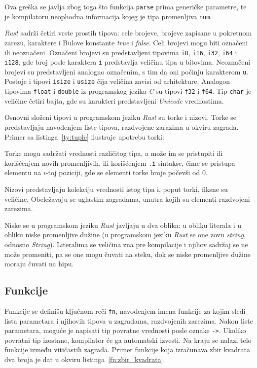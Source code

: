 \documentclass[12pt,oneside]{memoir}
\begin{document}
\noindent
Ova greška se javlja zbog toga što funkcija \texttt{parse}
prima generičke parametre, te je kompilatoru neophodna informacija
kojeg je tipa promenljiva \texttt{num}.

\emph{Rust} sadrži četiri vrste prostih tipova: cele brojeve,
brojeve zapisane u pokretnom zarezu, karaktere i Bulove
konstante \emph{true} i \emph{false}. Celi brojevi mogu biti
označeni ili neoznačeni. Označeni brojevi su predstavljeni
tipovima \texttt{i8}, \texttt{i16}, \texttt{i32}, \texttt{i64} i
\texttt{i128}, gde broj posle karaktera \texttt{i} predstavlja
veličinu tipa u bitovima. Neoznačeni brojevi su predstavljeni
analogno označenim, s tim da oni počinju karakterom \texttt{u}.
Postoje i tipovi \texttt{isize} i \texttt{usize} čija veličina
zavisi od arhitekture.
Analogon tipovima \texttt{float} i \texttt{double} iz programskog
jezika \emph{C} su tipovi \texttt{f32} i \texttt{f64}. Tip
\texttt{char} je veličine četiri bajta, gde su karakteri predstavljeni
\emph{Unicode} vrednostima.

Osnovni složeni tipovi u programskom jeziku \emph{Rust} su torke
i nizovi. Torke se predstavljaju navođenjem liste tipova, razdvojene zarazima u okviru
zagrada. Primer sa listinga~\ref{ty:tuple} ilustruje upotrebu torki:



Torke mogu sadržati vrednosti različitog tipa, a može im se pristupiti
ili korišćenjem novih promenljivih, ili korišćenjem \texttt{.i} sintakse,
čime se pristupa elementu na $i$-toj poziciji, gde se elementi torke broje
počevši od $0$.

Nizovi predstavljaju kolekciju vrednosti istog tipa i, poput torki,
fiksne su veličine. Obeležavaju se uglastim zagradama, unutra kojih su elementi
razdvojeni zarezima.

Niske se u programskom jeziku \emph{Rust} javljaju u dva oblika:
u obliku literala i u obliku niske promenljive dužine
(u programskom jeziku \emph{Rust} se one zovu \emph{string}, odnosno \emph{String}).
Literalima se veličina zna pre kompilacije i njihov sadržaj se ne može promeniti,
pa se one mogu čuvati na steku, dok se niske promenljive dužine moraju čuvati na hipu.

\subsection{Funkcije}
Funkcije se definišu ključnom reči \texttt{fn}, navođenjem imena funkcije za kojim sledi
lista parametara i njihovih tipova u zagradama, razdvojenih zarezima. Nakon liste parametara,
moguće je napisati tip povratne vrednosti posle oznake \texttt{->}. Ukoliko povratni tip izostane,
kompilator će ga automatski izvesti. Na kraju se nalazi telo funkcije između vitičastih zagrada.
Primer funkcije koja izračunava zbir kvadrata dva broja je dat u okviru listinga~\ref{fn:zbir_kvadrata}.
\end{document}
